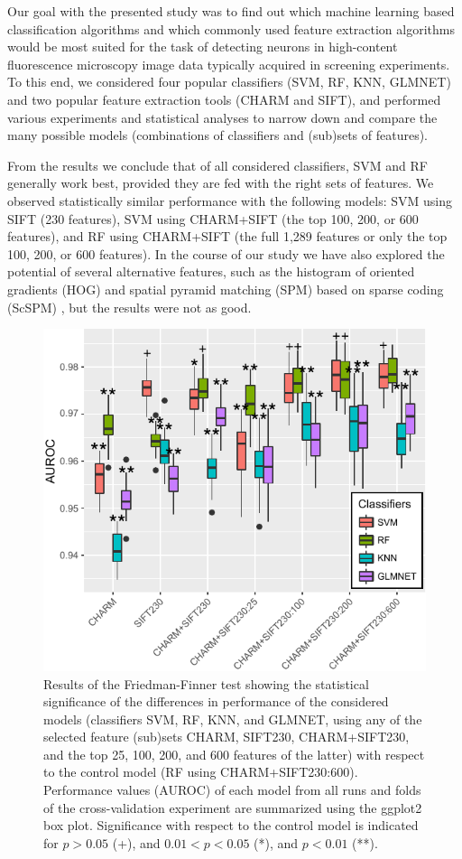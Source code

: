 Our goal with the presented study was to find out which machine learning based classification algorithms and which commonly used feature extraction algorithms would be most suited for the task of detecting neurons in high-content fluorescence microscopy image data typically acquired in screening experiments. To this end, we considered four popular classifiers (SVM, RF, KNN, GLMNET) and two popular feature extraction tools (CHARM and SIFT), and performed various experiments and statistical analyses to narrow down and compare the many possible models (combinations of classifiers and (sub)sets of features).

From the results we conclude that of all considered classifiers, SVM and RF generally work best, provided they are fed with the right sets of features. We observed statistically similar performance with the following models: SVM using SIFT (230 features), SVM using CHARM+SIFT (the top 100, 200, or 600 features), and RF using CHARM+SIFT (the full 1,289 features or only the top 100, 200, or 600 features). In the course of our study we have also explored the potential of several alternative features, such as the histogram of oriented gradients (HOG) \cite{Dalal} and spatial pyramid matching (SPM) \cite{Lazebnik} based on sparse coding (ScSPM) \cite{Yang}, but the results were not as good.

\begin{figure}
	\centering
	\includegraphics[width=\columnwidth]{fig10}
	\caption{Results of the Friedman-Finner test showing the statistical significance of the differences in performance of the considered models (classifiers SVM, RF, KNN, and GLMNET, using any of the selected feature (sub)sets CHARM, SIFT230, CHARM+SIFT230, and the top 25, 100, 200, and 600 features of the latter) with respect to the control model (RF using CHARM+SIFT230:600). Performance values (AUROC) of each model from all runs and folds of the cross-validation experiment are summarized using the ggplot2 box plot. Significance with respect to the control model is indicated for $p > 0.05$ (+), and $0.01 < p < 0.05$ (*), and $p < 0.01$ (**).}
	\label{fig:statisticalSignificance}
\end{figure}

